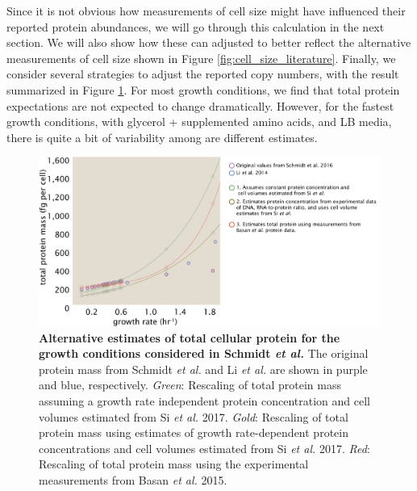 Since it is not obvious how measurements of cell size might have influenced
their reported protein abundances, we will go through this calculation in the
next section. We will also show how these can adjusted to better reflect the
alternative measurements of cell size shown in Figure
\ref{fig:cell_size_literature}. Finally, we consider several strategies to
adjust the reported copy numbers, with the result summarized in Figure
\ref{fig:schmidt_adjustment_summary}. For most growth conditions, we find that
total protein expectations are not expected to change dramatically. However, for
the fastest growth conditions, with glycerol + supplemented amino acids, and LB
media, there is quite a bit of variability among are different estimates.



%

\begin{figure}
		\centering
    \includegraphics[width=1\textwidth]{../../figures/schmidt_protein_corrections.pdf}
  \caption{{\bf Alternative estimates of total cellular protein for the growth conditions considered in Schmidt \textit{et al.}} The original protein mass from Schmidt \textit{et al.} and Li \textit{et al.} are shown in purple and blue, respectively. \textit{Green}: Rescaling of total protein mass assuming a growth rate independent protein concentration and cell volumes estimated from Si \textit{et al.} 2017.
  \textit{Gold}:  Rescaling of total protein mass using estimates of growth rate-dependent protein concentrations and cell volumes estimated from Si \textit{et al.} 2017.
  \textit{Red}: Rescaling of total protein mass using the experimental measurements from Basan \textit{et al.} 2015.
	 	}
  \label{fig:schmidt_adjustment_summary}
\end{figure}

